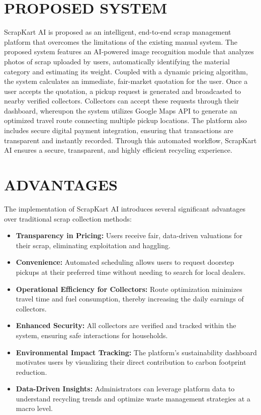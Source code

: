 \section{PROPOSED SYSTEM}
ScrapKart AI is proposed as an intelligent, end-to-end scrap management platform that overcomes the limitations of the existing manual system. The proposed system features an AI-powered image recognition module that analyzes photos of scrap uploaded by users, automatically identifying the material category and estimating its weight. Coupled with a dynamic pricing algorithm, the system calculates an immediate, fair-market quotation for the user. Once a user accepts the quotation, a pickup request is generated and broadcasted to nearby verified collectors. Collectors can accept these requests through their dashboard, whereupon the system utilizes Google Maps API to generate an optimized travel route connecting multiple pickup locations. The platform also includes secure digital payment integration, ensuring that transactions are transparent and instantly recorded. Through this automated workflow, ScrapKart AI ensures a secure, transparent, and highly efficient recycling experience.

\section{ADVANTAGES}
The implementation of ScrapKart AI introduces several significant advantages over traditional scrap collection methods:
\begin{itemize}
    \item \textbf{Transparency in Pricing:} Users receive fair, data-driven valuations for their scrap, eliminating exploitation and haggling.
    \item \textbf{Convenience:} Automated scheduling allows users to request doorstep pickups at their preferred time without needing to search for local dealers.
    \item \textbf{Operational Efficiency for Collectors:} Route optimization minimizes travel time and fuel consumption, thereby increasing the daily earnings of collectors.
    \item \textbf{Enhanced Security:} All collectors are verified and tracked within the system, ensuring safe interactions for households.
    \item \textbf{Environmental Impact Tracking:} The platform's sustainability dashboard motivates users by visualizing their direct contribution to carbon footprint reduction.
    \item \textbf{Data-Driven Insights:} Administrators can leverage platform data to understand recycling trends and optimize waste management strategies at a macro level.
\end{itemize}


